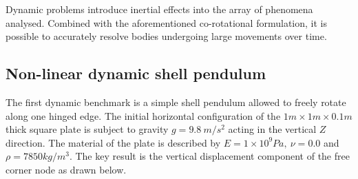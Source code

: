 Dynamic problems introduce inertial effects into the array of phenomena analysed. Combined with the aforementioned co-rotational formulation, it is possible to accurately resolve bodies undergoing large movements over time.

\subsection{Non-linear dynamic shell pendulum}
\label{validation:shell pendulum}
The first dynamic benchmark is a simple shell pendulum allowed to freely rotate along one hinged edge. The initial horizontal configuration of the $1m\times1m\times0.1m$ thick square plate is subject to gravity $g = 9.8\ m/s^2$ acting in the vertical $Z$ direction. The material of the plate is described by $E = 1\times 10^9 Pa,\ \nu = 0.0$ and $\rho = 7850 kg/m^3$. The key result is the vertical displacement component of the free corner node as drawn below.

